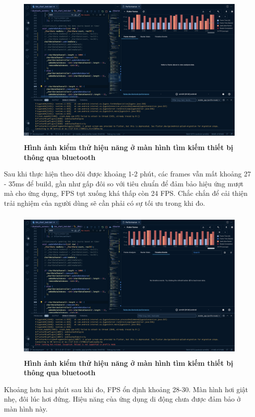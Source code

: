 \begin{enumerate}[a)]
  \begin{figure}[H]
    \centering
    \includegraphics[width=12cm,height=7.5cm]{Images/mobile_app/demo/pre_middle_measuring_performance.png}
    \caption[Hình ảnh kiểm thử hiệu năng ở màn hình tìm kiếm thiết bị thông qua bluetooth]{\bfseries \fontsize{12pt}{0pt}
    \selectfont Hình ảnh kiểm thử hiệu năng ở màn hình tìm kiếm thiết bị thông qua bluetooth}
    \label{pre_middle_measuring_performance}
  \end{figure}

  Sau khi thực hiện theo dõi được khoảng 1-2 phút, các frames vẫn mất khoảng 27 - 35ms để build, gần như gấp đôi so với
  tiêu chuẩn để đảm bảo hiệu ứng mượt mà cho ứng dụng, FPS tụt xuống khá thấp còn 24 FPS. Chắc chắn để cải thiện trải nghiệm
  của người dùng sẽ cần phải có sự tối ưu trong khi đo. 

  \begin{figure}[H]
    \centering
    \includegraphics[width=12cm,height=7.5cm]{Images/mobile_app/demo/middle_measuring_performance.png}
    \caption[Hình ảnh kiểm thử hiệu năng ở màn hình tìm kiếm thiết bị thông qua bluetooth]{\bfseries \fontsize{12pt}{0pt}
    \selectfont Hình ảnh kiểm thử hiệu năng ở màn hình tìm kiếm thiết bị thông qua bluetooth}
    \label{middle_measuring_performance}
  \end{figure}

  Khoảng hơn hai phút sau khi đo, FPS ổn định khoảng 28-30. Màn hình hơi giật nhẹ, đôi lúc hơi đứng. Hiệu năng của ứng dụng
  di động chưa được đảm bảo ở màn hình này.
    
\end{enumerate}


